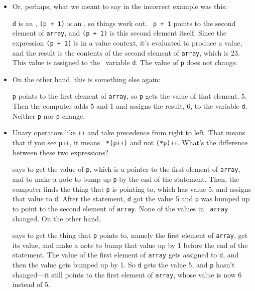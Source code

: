 \begin{itemize}
\item Or, perhaps, what we meant to say in the incorrect example was
this: 

\begin{flushleft}
\verb% d = *(p + 1);%
\end{flushleft}

{\tt d} is an \int, \mbox{\tt *(p + 1)} is an \int, so things work out.  \mbox{\tt
p + 1} points to the second element of {\tt array}, and \mbox{\tt *(p + 1)} is
this second element itself.  Since the expression \mbox{\tt *(p + 1)} is in a
value context, it's evaluated to produce a value, and the result is the
contents of the second element of {\tt array}, which is 23.  This value is
assigned to the \int\ variable {\tt d}.  The value of {\tt p} does not
change. 

\item On the other hand, this is something else again:

\begin{flushleft}
\verb% d = *p + 1;%
\end{flushleft}

{\tt p} points to the first element of {\tt array}, so {\tt *p} gets the
value of that element, 5.  Then the computer adds 5 and 1 and assigns
the result, 6, to the variable {\tt d}.  Neither {\tt p} nor {\tt *p}
change.  

\item Unary operators like {\tt ++} and {\tt *} take precedence from
right to left.  That means that if you see {\tt *p++}, it means {\tt
*(p++)} and not {\tt (*p)++}.  What's the difference between these two
expressions?

\begin{flushleft}
\verb% d = *(p++);% 
\end{flushleft}

\noindent says to get the value of {\tt p}, which is a pointer to the first
element of {\tt array}, and to make a note to bump up {\tt p} by the end
of the statement.  Then, the computer finds the thing that {\tt p} is
pointing to, which has value 5, and assigns that value to {\tt d}.
After the statement, {\tt d} got the value 5 and {\tt p} was bumped up
to point to the second element of {\tt array}.  None of the values in {\tt
array} changed.  On the other hand,

\begin{flushleft}
\verb% d = (*p)++;% 
\end{flushleft}

\noindent says to get the thing that {\tt p} points to, namely the first
element of {\tt array}, get its value, and make a note to bump that value
up by 1 before the end of the statement.  The value of the first element
of {\tt array} gets assigned to {\tt d}, and then the value gets bumped up
by 1.  So {\tt d} gets the value 5, and {\tt p} hasn't changed---it
still points to the first element of {\tt array}, whose value is now 6
instead of 5.


\end{itemize}
